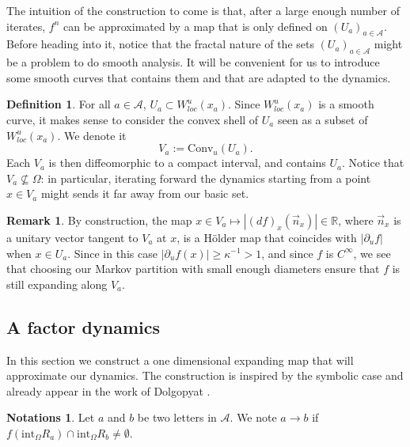 \documentclass[a4paper]{article}
\theoremstyle{definition}
\newtheorem{definition}{Definition}[section]
\newtheorem{remark}[example]{Remark}
\newtheorem{notations}[example]{Notations}
\begin{document}
The intuition of the construction to come is that, after a large enough number of iterates, $f^n$ can be approximated by a map that is only defined on $(U_a)_{a \in \mathcal{A}}$. Before heading into it, notice that the fractal nature of the sets $(U_a)_{a \in \mathcal{A}}$ might be a problem to do smooth analysis. It will be convenient for us to introduce some smooth curves that contains them and that are adapted to the dynamics.


\begin{definition}
For all $a \in \mathcal{A}$, $U_a \subset W^u_{loc}(x_a)$. Since $W^u_{loc}(x_a)$ is a smooth curve, it makes sense to consider the convex shell of $U_a$ seen as a subset of $W^u_{loc}(x_a)$. We denote it
$$ V_a := \text{Conv}_u(U_a) .$$
Each $V_a$ is then diffeomorphic to a compact interval, and contains $U_a$. Notice that $V_a \nsubseteq \Omega$: in particular, iterating forward the dynamics starting from a point $x \in V_a$ might sends it far away from our basic set.  
\end{definition}

\begin{remark}
By construction, the map $x \in V_a \mapsto |(df)_x(\vec{n}_x)| \in \mathbb{R}$, where $\vec{n}_x$ is a unitary vector tangent to $V_a$ at $x$, is a Hölder map that coincides with $|\partial_u f|$ when $x \in U_a$. Since in this case $|\partial_u f(x)| \geq \kappa^{-1} >1$, and since $f$ is $C^{\infty}$, we see that choosing our Markov partition with small enough diameters ensure that $f$ is still expanding along $V_a$.
\end{remark}




\subsection{A factor dynamics}

In this section we construct a one dimensional expanding map that will approximate our dynamics. The construction is inspired by the symbolic case and already appear in the work of Dolgopyat \cite{Do98}. 

\begin{notations}
Let $a$ and $b$ be two letters in $\mathcal{A}$.
We note $a \rightarrow b$ if $f(\text{int}_\Omega R_a) \cap \text{int}_\Omega R_b \neq \emptyset $.

\end{notations}
\end{document}
